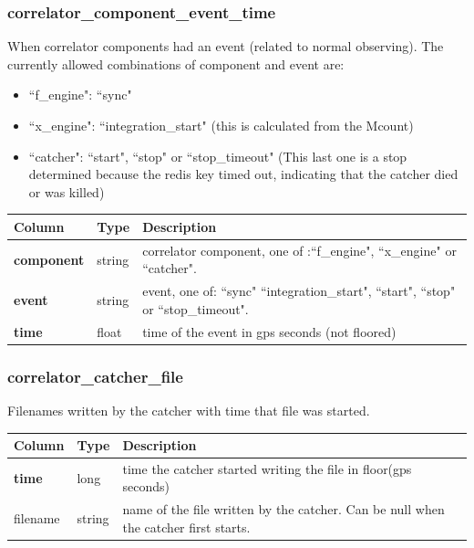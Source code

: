 \documentclass{article}
\begin{document}
{\subsubsection{correlator\_component\_event\_time}
When correlator components had an event (related to normal observing). The currently allowed combinations of component and event are:
\begin{itemize}
  \item ``f\_engine": ``sync"
  \item ``x\_engine": ``integration\_start" (this is calculated from the Mcount)
  \item ``catcher": ``start", ``stop" or ``stop\_timeout" (This last one is a stop determined because the redis key timed out, indicating that the catcher died or was killed)
 \end{itemize}
\begin{center}
 \begin{tabular}{| p{4cm} | p{2cm} | p{10cm} |}
\hline
 {\bf Column} & {\bf Type}  & {\bf Description} \\ [0.5ex]  \hline\hline
\textbf{component} & string & correlator component, one of :``f\_engine", ``x\_engine" or ``catcher".\\ \hline
\textbf{event} & string & event, one of: ``sync" ``integration\_start", ``start", ``stop" or ``stop\_timeout".\\ \hline
\textbf{time} & float & time of the event in gps seconds (not floored)\\ \hline
\end{tabular}
\end{center}

\subsubsection{correlator\_catcher\_file}
Filenames written by the catcher with time that file was started.
\begin{center}
 \begin{tabular}{| p{4cm} | p{2cm} | p{10cm} |}
\hline
 {\bf Column} & {\bf Type}  & {\bf Description} \\ [0.5ex]  \hline\hline
\textbf{time} & long & time the catcher started writing the file in floor(gps seconds)\\ \hline
filename & string & name of the file written by the catcher. Can be null when the catcher first starts. \\ \hline
\end{tabular}
\end{center}

}
\end{document}
